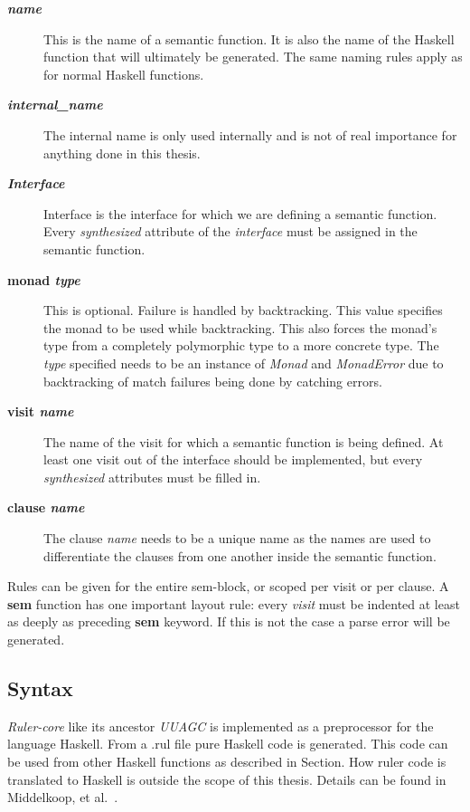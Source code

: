 \documentclass[twoside, titlepage, openright, a4paper]{book}
\newcommand{\Rcore}{\emph{Ruler-core }}
\begin{document}
\begin{description}
\item[\textbf{\textit{name}}] This is the name of a semantic function. It is also the name of the Haskell function that will ultimately be generated. The same naming rules apply as for normal Haskell functions.
\item[\textbf{\textit{internal\_name}}] The internal name is only used internally and is not of real importance for anything done in this thesis.
\item[\textbf{\textit{Interface}}] Interface is the interface for which we are defining a semantic function. Every \emph{synthesized} attribute of the \emph{interface} must be assigned in the semantic function.
\item[\textbf{monad \textit{type}}] { This is optional. Failure is handled by backtracking. This value specifies the monad to be used while backtracking. This also forces the monad's type from a completely polymorphic type to a more concrete type. The \textit{type} specified needs to be an instance of \emph{Monad} and \emph{MonadError} due to backtracking of match failures being done by catching errors.}
\item[\textbf{visit \textit{name}}] The name of the visit for which a semantic function is being defined. At least one visit out of the interface should be implemented, but every \emph{synthesized} attributes must be filled in.
\item[\textbf{clause \textit{name}}] The clause \textit{name} needs to be a unique name as the names are used to differentiate the clauses from one another inside the semantic function.
\end{description}

Rules can be given for the entire sem-block, or scoped per visit or per clause.
A \textbf{sem} function has one important layout rule: every \emph{visit} must be indented at least as deeply as preceding \textbf{sem} keyword. If this is not the case a parse error will be generated.

\subsection{Syntax}
\Rcore like its ancestor \emph{UUAGC} is implemented as a preprocessor for the language Haskell. From a .rul file pure Haskell code is generated. This code can be used from other Haskell functions as described in Section\cite{calling:sem}. How ruler code is translated to Haskell is outside the scope of this thesis. Details can be found in Middelkoop, et al.~\cite{visitag}.
\end{document}
